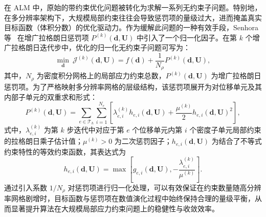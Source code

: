 在 ALM 中，原始的带约束优化问题被转化为求解一系列无约束子问题。特别地，在多分辨率架构下，大规模局部约束往往会导致惩罚项的量级过大，进而掩盖真实目标函数（体积分数）的优化驱动力。作为缓解此问题的一种有效手段，Senhora 等~\cite{senhoraTopologyOptimizationLocal2020} 在增广拉格朗日惩罚项 $P^{(k)}(\boldsymbol{d}, \boldsymbol{U})$ 中引入了一个归一化因子。在第 $k$ 个增广拉格朗日迭代步中，优化的归一化无约束子问题可写为：
\begin{equation} \label{eq:ch4_alm_subproblem}
	\min_{\boldsymbol{d}}~\mathcal{J}^{(k)}(\boldsymbol{d}, \boldsymbol{U}) = f(\boldsymbol{d}) + \frac{1}{N_\rho} P^{(k)}(\boldsymbol{d}, \boldsymbol{U}),
\end{equation}
其中，$N_\rho$ 为密度积分网格上的局部应力约束总数，$P^{(k)}(\boldsymbol{d}, \boldsymbol{U})$ 为增广拉格朗日惩罚项。为了严格映射多分辨率网格的层级结构，该惩罚项展开为对位移单元及其内部子单元的双重求和形式：
\[
P^{(k)}(\boldsymbol{d}, \boldsymbol{U}) = \sum_{e \in \mathcal{T}_h} \sum_{i=1}^{N_e} \left[ \lambda_{e,i}^{(k)} h_{e,i}(\boldsymbol{d}, \boldsymbol{U}) + \frac{\mu^{(k)}}{2} h_{e,i}(\boldsymbol{d}, \boldsymbol{U})^2 \right],
\]
式中，$\lambda_{e,i}^{(k)}$ 为第 $k$ 步迭代中对应于第 $e$ 个位移单元内第 $i$ 个密度子单元局部约束的拉格朗日乘子估计值；$\mu^{(k)} > 0$ 为二次惩罚因子；$h_{e,i}(\boldsymbol{d}, \boldsymbol{U})$ 为结合了不等式约束特性的等效约束函数，其表达式为
\[
h_{e,i}(\boldsymbol{d}, \boldsymbol{U}) = \max \left[ g_{e,i}(\boldsymbol{d}, \boldsymbol{U}), -\frac{\lambda_{e,i}^{(k)}}{\mu^{(k)}} \right].
\]
通过引入系数 $1/N_\rho$ 对惩罚项进行归一化处理，可以有效保证在约束数量随高分辨率网格剧增时，目标函数与惩罚项在数值演化过程中始终保持合理的量级平衡，从而显著提升算法在大规模局部应力约束问题上的稳健性与收敛效率。


